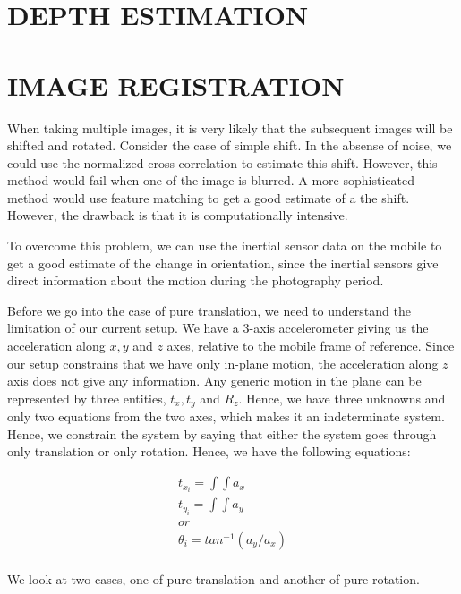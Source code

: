 \documentclass[BTech]{iitmdiss}
\begin{document}
\chapter{DEPTH ESTIMATION}
\label{chap:depth_estimation}

\chapter{IMAGE REGISTRATION}
\label{chap:image_registration}
When taking multiple images, it is very likely that the subsequent 
images will be shifted and rotated. Consider the case of simple shift. 
In the absense of noise, we could use the normalized cross correlation
to estimate this shift. However, this method would fail when one of the 
image is blurred. A more sophisticated method would use feature matching
to get a good estimate of a the shift. However, the drawback is that it
is computationally intensive.

To overcome this problem, we can use the inertial sensor data on the 
mobile to get a good estimate of the change in orientation, since the 
inertial sensors give direct information about the motion during the 
photography period. 

Before we go into the case of pure translation, we need to understand 
the limitation of our current setup. We have a 3-axis accelerometer 
giving us the acceleration along ${x, y}$ and $z$ axes, relative to
the mobile frame of reference. Since our setup constrains that we have
only in-plane motion, the acceleration along $z$ axis does not give 
any information. Any generic motion in the plane can be represented by
three entities, ${t_x, t_y}$ and $R_z$. Hence, we have three unknowns
and only two equations from the two axes, which makes it an 
indeterminate system. Hence, we constrain the system by saying that
either the system goes through only translation or only rotation. Hence,
we have the following equations:

\begin{align*}
t_{x_i}=\int{\int{a_x}}\\
t_{y_i}=\int{\int{a_y}}\\
or\\
{\theta}_i=tan^{-1}({a_y}/{a_x})\\
\end{align*}

We look at two cases, one of pure translation and another of pure 
rotation.
\end{document}
